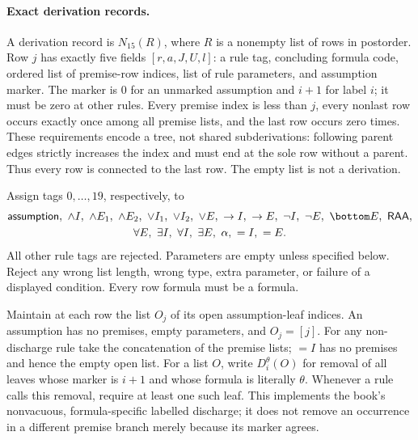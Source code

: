 \paragraph{Exact derivation records.}
A derivation record is \(N_{15}(R)\), where \(R\) is a nonempty list of
rows in postorder.  Row \(j\) has exactly five fields
\([r,a,J,U,l]\): a rule tag, concluding formula code, ordered list of
premise-row indices, list of rule parameters, and assumption marker.
The marker is \(0\) for an unmarked assumption and \(i+1\) for label
\(i\); it must be zero at other rules.  Every premise index is less than
\(j\), every nonlast row occurs exactly once among all premise lists,
and the last row occurs zero times.  These requirements encode a tree,
not shared subderivations: following parent edges strictly increases the
index and must end at the sole row without a parent.  Thus every row is
connected to the last row.  The empty list is not a derivation.

Assign tags \(0,\ldots,19\), respectively, to
\[
\begin{gathered}
 \mathsf{assumption},\ \land I,\ \land E_1,\ \land E_2,\
 \lor I_1,\ \lor I_2,\ \lor E,\ \to I,\ \to E,\
 \neg I,\ \neg E,\ \bottom E,\ \mathsf{RAA},\\
 \forall E,\ \exists I,\ \forall I,\ \exists E,\ \alpha,\ =I,\ =E.
\end{gathered}
\]
All other rule tags are rejected.  Parameters are empty unless specified
below.  Reject any wrong list length, wrong type, extra parameter, or
failure of a displayed condition.  Every row formula must be a formula.

Maintain at each row the list \(O_j\) of its open assumption-leaf indices.
An assumption has no premises, empty parameters, and \(O_j=[j]\).
For any non-discharge rule take the concatenation of the premise lists;
\(=I\) has no premises and hence the empty open list.  For a list \(O\),
write \(D_i^\theta(O)\) for removal of all leaves whose marker is
\(i+1\) and whose formula is literally \(\theta\).  Whenever a rule
calls this removal, require at least one such leaf.  This implements the
book's nonvacuous, formula-specific labelled discharge; it does not remove
an occurrence in a different premise branch merely because its marker agrees.

